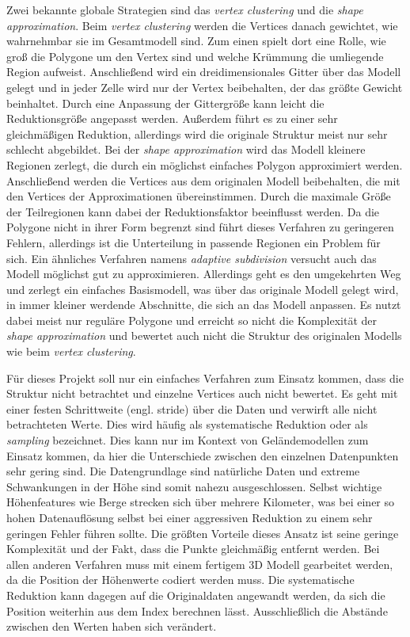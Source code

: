 Zwei bekannte globale Strategien sind das \textit{vertex clustering} und die \textit{shape approximation}. Beim \textit{vertex clustering} werden die Vertices danach gewichtet, wie wahrnehmbar sie im Gesamtmodell sind. Zum einen spielt dort eine Rolle, wie groß die Polygone um den Vertex sind und welche Krümmung die umliegende Region aufweist. Anschließend wird ein dreidimensionales Gitter über das Modell gelegt und in jeder Zelle wird nur der Vertex beibehalten, der das größte Gewicht beinhaltet. Durch eine Anpassung der Gittergröße kann leicht die Reduktionsgröße angepasst werden. Außerdem führt es zu einer sehr gleichmäßigen Reduktion, allerdings wird die originale Struktur meist nur sehr schlecht abgebildet\cite[Abschnitt 4.1]{meshSimplSurvey}. Bei der \textit{shape approximation} wird das Modell kleinere Regionen zerlegt, die durch ein möglichst einfaches Polygon approximiert werden. Anschließend werden die Vertices aus dem originalen Modell beibehalten, die mit den Vertices der Approximationen übereinstimmen. Durch die maximale Größe der Teilregionen kann dabei der Reduktionsfaktor beeinflusst werden. Da die Polygone nicht in ihrer Form begrenzt sind führt dieses Verfahren zu geringeren Fehlern, allerdings ist die Unterteilung in passende Regionen ein Problem für sich\cite[Abschnitt 4.2]{meshSimplSurvey}. Ein ähnliches Verfahren namens \textit{adaptive subdivision} versucht auch das Modell möglichst gut zu approximieren. Allerdings geht es den umgekehrten Weg und zerlegt ein einfaches Basismodell, was über das originale Modell gelegt wird, in immer kleiner werdende Abschnitte, die sich an das Modell anpassen. Es nutzt dabei meist nur reguläre Polygone und erreicht so nicht die Komplexität der \textit{shape approximation} und bewertet auch nicht die Struktur des originalen Modells wie beim \textit{vertex clustering}\cite[Abschnitt 4.1.2]{meshSimplOverview}.

Für dieses Projekt soll nur ein einfaches Verfahren zum Einsatz kommen, dass die Struktur nicht betrachtet und einzelne Vertices auch nicht bewertet. Es geht mit einer festen Schrittweite (engl. stride) über die Daten und verwirft alle nicht betrachteten Werte. Dies wird häufig als systematische Reduktion oder als \textit{sampling}\cite[Abschnitt 4.1.3]{meshSimplOverview} bezeichnet. Dies kann nur im Kontext von Geländemodellen zum Einsatz kommen, da hier die Unterschiede zwischen den einzelnen Datenpunkten sehr gering sind. Die Datengrundlage sind natürliche Daten und extreme Schwankungen in der Höhe sind somit nahezu ausgeschlossen. Selbst wichtige Höhenfeatures wie Berge strecken sich über mehrere Kilometer, was bei einer so hohen Datenauflösung selbst bei einer aggressiven Reduktion zu einem sehr geringen Fehler führen sollte. Die größten Vorteile dieses Ansatz ist seine geringe Komplexität und der Fakt, dass die Punkte gleichmäßig entfernt werden. Bei allen anderen Verfahren muss mit einem fertigem 3D Modell gearbeitet werden, da die Position der Höhenwerte codiert werden muss. Die systematische Reduktion kann dagegen auf die Originaldaten angewandt werden, da sich die Position weiterhin aus dem Index berechnen lässt. Ausschließlich die Abstände zwischen den Werten haben sich verändert.

